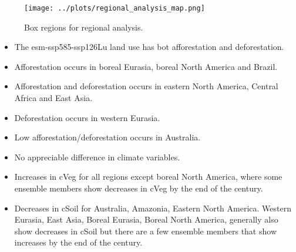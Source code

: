 \documentclass[]{article}
\begin{document}
\begin{figure}[H]
    \centering
    \texttt{[image: ../plots/regional\_analysis\_map.png]}
    \caption{Box regions for regional analysis.}
    \label{fig:my_label}
\end{figure}

\begin{itemize}
    \item The esm-ssp585-ssp126Lu land use has bot afforestation and deforestation.
    \item Afforestation occurs in boreal Eurasia, boreal North America and Brazil.
    \item Afforestation and deforestation occurs in eastern North America, Central Africa and East Asia.
    \item Deforestation occurs in western Eurasia.
    \item Low afforestation/deforestation occurs in Australia.
    \item No appreciable difference in climate variables.
    \item Increases in cVeg for all regions except boreal North America, where some ensemble members show decreases in cVeg by the end of the century.
    \item Decreases in cSoil for Australia, Amazonia, Eastern North America. Western Eurasia, East Asia, Boreal Eurasia, Boreal North America, generally also show decreases in cSoil but there are a few ensemble members that show increases by the end of the century.
\end{itemize}
\end{document}
